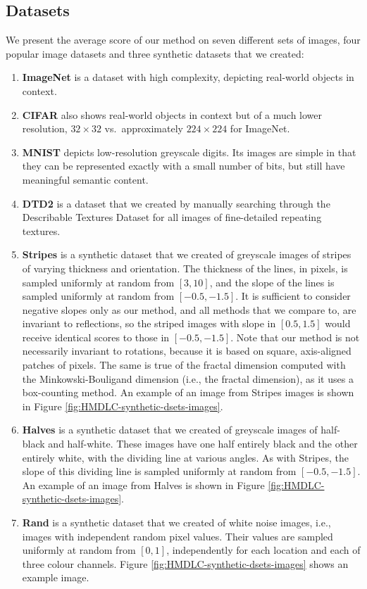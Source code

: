 \documentclass[a4paper,fleqn]{cas-sc}
\theoremstyle{remark}
\begin{document}
\subsection{Datasets}
We present the average score of our method on seven different sets of images, four popular image datasets and three synthetic datasets that we created: 
\begin{enumerate}
\item \textbf{ImageNet} is a dataset with high complexity, depicting real-world objects in context. 
\item \textbf{CIFAR} also shows real-world objects in context but of a much lower resolution, $32 \times 32$ vs.~approximately $224 \times 224$ for ImageNet. 
\item \textbf{MNIST} depicts low-resolution greyscale digits. Its images are simple in that they can be represented exactly with a small number of bits, but still have meaningful semantic content. 
\item \textbf{DTD2} is a dataset that we created by manually searching through the Describable Textures Dataset \parencite{cimpoi2014describing} for all images of fine-detailed repeating textures.%
\item \textbf{Stripes} is a synthetic dataset that we created of greyscale images of stripes of varying thickness and orientation. The thickness of the lines, in pixels, is sampled uniformly at random from $[3,10]$, and the slope of the lines is sampled uniformly at random from $[-0.5, -1.5]$. It is sufficient to consider negative slopes only as our method, and all methods that we compare to, are invariant to reflections, so the striped images with slope in $[0.5, 1.5]$ would receive identical scores to those in $[-0.5, -1.5]$. Note that our method is not necessarily invariant to rotations, because it is based on square, axis-aligned patches of pixels. The same is true of the fractal dimension computed with the Minkowski-Bouligand dimension (i.e., the fractal dimension), as it uses a box-counting method. An example of an image from Stripes images is shown in Figure \ref{fig:HMDLC-synthetic-dsets-images}.
\\
\item \textbf{Halves} is a synthetic dataset that we created  of greyscale images of half-black and half-white. These images have one half entirely black and the other entirely white, with the dividing line at various angles. As with Stripes, the slope of this dividing line is sampled uniformly at random from $[-0.5, -1.5]$. An example of an image from Halves is shown in Figure \ref{fig:HMDLC-synthetic-dsets-images}.
\\
\item \textbf{Rand} is a synthetic dataset that we created of white noise images, i.e., images with independent random pixel values. Their values are sampled uniformly at random from $[0,1]$, independently for each location and each of three colour channels. Figure \ref{fig:HMDLC-synthetic-dsets-images} shows an example image.
\\
\end{enumerate}
\end{document}
